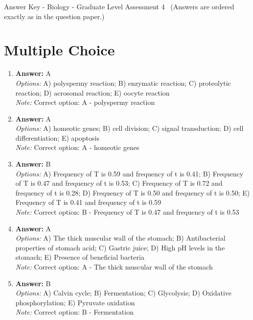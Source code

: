 \documentclass[12pt]{article}
\begin{document}
\begin{center}
Answer Key - Biology - Graduate Level Assessment 4 \
\small (Answers are ordered exactly as in the question paper.)
\end{center}

\section*{Multiple Choice}
\begin{enumerate}[label=\arabic*.]
\item \textbf{Answer:} A
\\ \textit{Options:} A) polyspermy reaction; B) enzymatic reaction; C) proteolytic reaction; D) acrosomal reaction; E) oocyte reaction
\\ \textit{Note:} Correct option: A - polyspermy reaction
\item \textbf{Answer:} A
\\ \textit{Options:} A) homeotic genes; B) cell division; C) signal transduction; D) cell differentiation; E) apoptosis
\\ \textit{Note:} Correct option: A - homeotic genes
\item \textbf{Answer:} B
\\ \textit{Options:} A) Frequency of T is 0.59 and frequency of t is 0.41; B) Frequency of T is 0.47 and frequency of t is 0.53; C) Frequency of T is 0.72 and frequency of t is 0.28; D) Frequency of T is 0.50 and frequency of t is 0.50; E) Frequency of T is 0.41 and frequency of t is 0.59
\\ \textit{Note:} Correct option: B - Frequency of T is 0.47 and frequency of t is 0.53
\item \textbf{Answer:} A
\\ \textit{Options:} A) The thick muscular wall of the stomach; B) Antibacterial properties of stomach acid; C) Gastric juice; D) High pH levels in the stomach; E) Presence of beneficial bacteria
\\ \textit{Note:} Correct option: A - The thick muscular wall of the stomach
\item \textbf{Answer:} B
\\ \textit{Options:} A) Calvin cycle; B) Fermentation; C) Glycolysis; D) Oxidative phosphorylation; E) Pyruvate oxidation
\\ \textit{Note:} Correct option: B - Fermentation
\end{enumerate}
\end{document}
